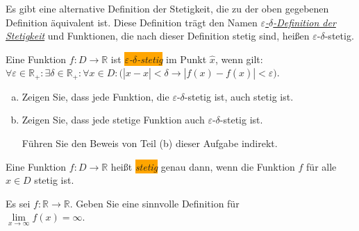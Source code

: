 \noindent
Es gibt eine alternative Definition der Stetigkeit, die zu der oben gegebenen Definition
\"aquivalent ist. Diese Definition tr\"agt den Namen 
\href{http://de.wikipedia.org/wiki/Epsilon-Delta-Kriterium#Stetigkeit_reeller_Funktionen}{\emph{$\varepsilon$-$\delta$-Definition der Stetigkeit}} 
und Funktionen, die nach dieser Definition stetig sind, hei{\ss}en $\varepsilon$-$\delta$-stetig.

\begin{Definition} 
  Eine Funktion $f:D \rightarrow \mathbb{R}$ ist \colorbox{orange}{\emph{$\varepsilon$-$\delta$-stetig}} im Punkt
  $\widehat{x}$, wenn gilt: 
  \\[0.2cm]
  \hspace*{1.3cm}
  $\forall \varepsilon \in \mathbb{R}_+: \exists \delta \in \mathbb{R}_+: \forall x \in D: 
   \bigl(|x - \widehat{x}| < \delta \rightarrow |f(x) - f(\widehat{x})| < \varepsilon\bigr)$.
  \eod
\end{Definition}


\exercise
\begin{enumerate}[(a)]
\item Zeigen Sie, dass jede Funktion, die $\varepsilon$-$\delta$-stetig ist,
      auch stetig ist.
\item Zeigen Sie, dass jede stetige Funktion auch $\varepsilon$-$\delta$-stetig ist.

      \hint 
      F\"uhren Sie den Beweis von Teil (b) dieser Aufgabe indirekt.
      \eox
\end{enumerate}


\begin{Definition} \lb
Eine Funktion $f:D \rightarrow \mathbb{R}$ hei{\ss}t \colorbox{orange}{\emph{stetig}} genau dann, wenn
die Funktion $f$ f\"ur alle $\widehat{x} \in D$ stetig ist.
\eod
\end{Definition}

\exercise
Es sei $f: \mathbb{R} \rightarrow \mathbb{R}$.  Geben Sie eine sinnvolle Definition f\"ur 
\\[0.2cm]
\hspace*{1.3cm}
$\lim\limits_{x\rightarrow\infty} f(x) = \infty$.
\eox

